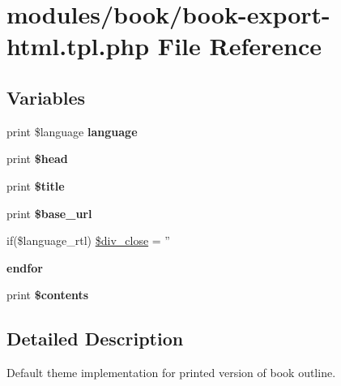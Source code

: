 \hypertarget{book-export-html_8tpl_8php}{
\section{modules/book/book-export-html.tpl.php File Reference}
\label{book-export-html_8tpl_8php}
}
\subsection*{Variables}
\begin{CompactItemize}
\item 
\hypertarget{book-export-html_8tpl_8php_42cd582c44c919666b05626f0b2a39d3}{
print \$language \textbf{language}}
\label{book-export-html_8tpl_8php_42cd582c44c919666b05626f0b2a39d3}

\item 
\hypertarget{book-export-html_8tpl_8php_2758cd2886f39b56c05b61ab6cec7a5d}{
print \textbf{\$head}}
\label{book-export-html_8tpl_8php_2758cd2886f39b56c05b61ab6cec7a5d}

\item 
\hypertarget{book-export-html_8tpl_8php_ec2795512d255332f57cacd930a090b4}{
print \textbf{\$title}}
\label{book-export-html_8tpl_8php_ec2795512d255332f57cacd930a090b4}

\item 
\hypertarget{book-export-html_8tpl_8php_73af004a34e36e5a0d7c577096a9d84b}{
print \textbf{\$base\_\-url}}
\label{book-export-html_8tpl_8php_73af004a34e36e5a0d7c577096a9d84b}

\item 
if(\$language\_\-rtl) \hyperlink{book-export-html_8tpl_8php_d7ca5cbbe327a2d37bf5ac15dc38efe0}{\$div\_\-close} = ''
\item 
\hypertarget{book-export-html_8tpl_8php_e8fdc27183f296411bac00ed522ee1ac}{
\textbf{endfor}}
\label{book-export-html_8tpl_8php_e8fdc27183f296411bac00ed522ee1ac}

\item 
\hypertarget{book-export-html_8tpl_8php_e5669c449da191330771ceda05435811}{
print \textbf{\$contents}}
\label{book-export-html_8tpl_8php_e5669c449da191330771ceda05435811}

\end{CompactItemize}


\subsection{Detailed Description}
Default theme implementation for printed version of book outline.

